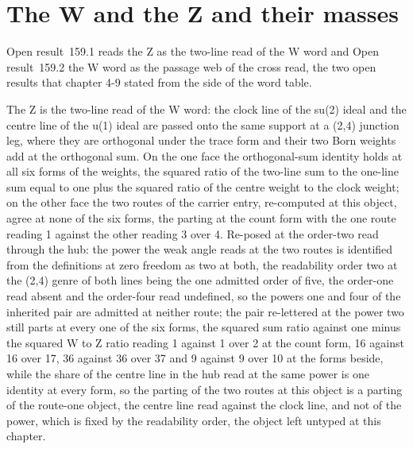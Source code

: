 \label{chend:VI-1-hub-step-as-the-weak-interaction}
\par\medskip{}\label{narr:close:6-1}\par
\section{The W and the Z and their masses}\label{mod:VI-2-w-and-the-z-and-their-masses}
\label{narr:open:6-2}Open result~159.1 reads the Z as the two-line read of the W word and Open result~159.2 the W word as the passage web of the cross read, the two open results that chapter 4-9 stated from the side of the word table.
\begin{chwall}\label{box:VI-2-w-and-the-z-and-their-masses:1}
The Z is the two-line read of the W word: the clock line of the su(2) ideal and the centre line of the u(1) ideal are passed onto the same support at a (2,4) junction leg, where they are orthogonal under the trace form and their two Born weights add at the orthogonal sum. On the one face the orthogonal-sum identity holds at all six forms of the weights, the squared ratio of the two-line sum to the one-line sum equal to one plus the squared ratio of the centre weight to the clock weight; on the other face the two routes of the carrier entry, re-computed at this object, agree at none of the six forms, the parting at the count form with the one route reading 1 against the other reading 3 over 4. Re-posed at the order-two read through the hub: the power the weak angle reads at the two routes is identified from the definitions at zero freedom as two at both, the readability order two at the (2,4) genre of both lines being the one admitted order of five, the order-one read absent and the order-four read undefined, so the powers one and four of the inherited pair are admitted at neither route; the pair re-lettered at the power two still parts at every one of the six forms, the squared sum ratio against one minus the squared W to Z ratio reading 1 against 1 over 2 at the count form, 16 against 16 over 17, 36 against 36 over 37 and 9 against 9 over 10 at the forms beside, while the share of the centre line in the hub read at the same power is one identity at every form, so the parting of the two routes at this object is a parting of the route-one object, the centre line read against the clock line, and not of the power, which is fixed by the readability order, the object left untyped at this chapter.
\end{chwall}
